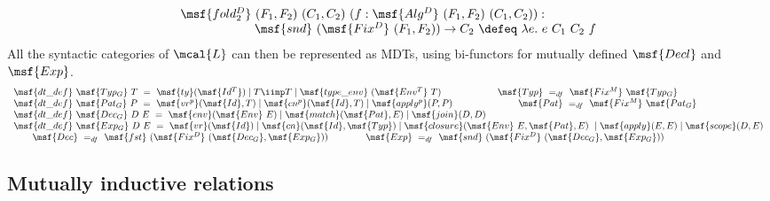 \documentclass[submission,copyright,creativecommons]{eptcs}
\begin{document}
\begin{gather} 
\begin{array}{lll}
\msf{fold^D_2} \ (F_1, F_2) \ (C_1, C_2) \ (f: \msf{Alg^D} \ (F_1,
F_2) \ (C_1, C_2)): \\
\qquad \qquad \qquad \msf{snd} \ (\msf{Fix^D} \ (F_1, F_2)) \to C_2
\ \defeq \ \lambda e. \ e \ C_1 \ C_2 \ f
\end{array}
\end{gather} 
All the syntactic categories of $\mcal{L}$ can then be represented as
MDTs, using bi-functors for mutually defined $\msf{Decl}$ and
$\msf{Exp}$.
\begin{gather}  
\begin{array}{llll}
 \msf{dt\_def} \ \msf{Typ_G} \ T \ = \ \msf{ty}(\msf{Id^T}) \mid
 T \iimp T \mid \msf{type\_env} \ (\msf{Env^T} \ T) 
\qquad \qquad \qquad
\msf{Typ} \ =_{df} \ \msf{Fix^M} \ \msf{Typ_G}
\\
\msf{dt\_def} \ \msf{Pat_G} \ P \ = \ \msf{vr^p}(\msf{Id},T) \mid
 \msf{cn^p}(\msf{Id},T) \mid \msf{apply^p}(P,P) 
\qquad \qquad \qquad \quad 
\msf{Pat} \ =_{df} \ \msf{Fix^M} \ \msf{Pat_G}
\\
\msf{dt\_def} \ \msf{Dec_G} \ D \ E \ = \ \msf{env}(\msf{Env} \ E) \mid
 \msf{match}(\msf{Pat}, E) \mid \msf{join}(D,D) \\
\msf{dt\_def} \ \msf{Exp_G} \ D \ E \ = \ \msf{vr}(\msf{Id}) \mid
 \msf{cn}(\msf{Id},\msf{Typ}) \mid \msf{closure}(\msf{Env} \ E, \msf{Pat},
 E) \  \mid \msf{apply}(E, E) \mid
 \msf{scope}(D, E) \\
\qquad \msf{Dec} \ =_{df} \ \msf{fst} \ (\msf{Fix^D}
 \ (\msf{Dec_G},\msf{Exp_G})) 
\qquad \qquad \msf{Exp} \ =_{df} \ \msf{snd} \ (\msf{Fix^D}
\ (\msf{Dec_G},\msf{Exp_G}))
\end{array}
 \end{gather} 




\subsection{Mutually inductive relations}
\end{document}
